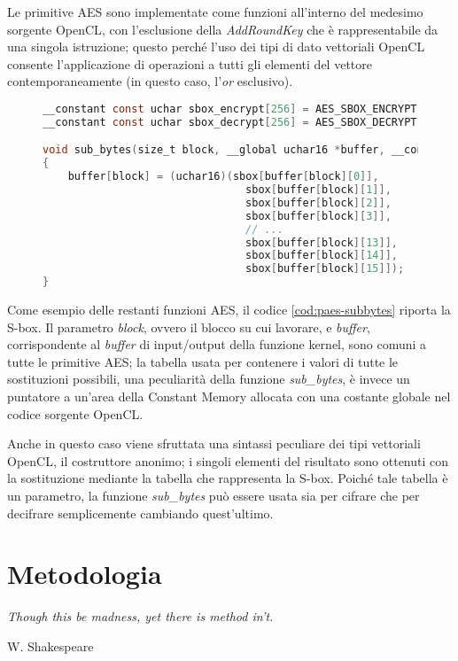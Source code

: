 \documentclass[12pt,a4paper,oneside]{book}
\begin{document}
Le primitive \ac{AES} sono implementate come funzioni all'interno del medesimo sorgente \ac{OpenCL}, con l'esclusione della \textit{AddRoundKey} che è rappresentabile da una singola istruzione; questo perché l'uso dei tipi di dato vettoriali \ac{OpenCL} consente l'applicazione di operazioni a tutti gli elementi del vettore contemporaneamente (in questo caso, l'\textit{or} esclusivo).

\begin{figure}
\begin{lstlisting}[caption={\textit{Funzione SubBytes definita nel kernel.}},label={cod:paes-subbytes},language=C]
__constant const uchar sbox_encrypt[256] = AES_SBOX_ENCRYPT;
__constant const uchar sbox_decrypt[256] = AES_SBOX_DECRYPT;

void sub_bytes(size_t block, __global uchar16 *buffer, __constant const uchar *sbox)
{
	buffer[block] = (uchar16)(sbox[buffer[block][0]], 
								sbox[buffer[block][1]],
								sbox[buffer[block][2]], 
								sbox[buffer[block][3]], 
								// ... 
								sbox[buffer[block][13]], 
								sbox[buffer[block][14]],
								sbox[buffer[block][15]]);
}
\end{lstlisting}
\end{figure}

Come esempio delle restanti funzioni \ac{AES}, il codice \ref{cod:paes-subbytes} riporta la \ac{S-box}. Il parametro \textit{block}, ovvero il blocco su cui lavorare, e \textit{buffer}, corrispondente al \textit{buffer} di input/output della funzione kernel, sono comuni a tutte le primitive \ac{AES}; la tabella usata per contenere i valori di tutte le sostituzioni possibili, una peculiarità della funzione \textit{sub\_bytes}, è invece un puntatore a un'area della Constant Memory allocata con una costante globale nel codice sorgente \ac{OpenCL}.

Anche in questo caso viene sfruttata una sintassi peculiare dei tipi vettoriali \ac{OpenCL}, il costruttore anonimo; i singoli elementi del risultato sono ottenuti con la sostituzione mediante la tabella che rappresenta la \ac{S-box}. Poiché tale tabella è un parametro, la funzione \textit{sub\_bytes} può essere usata sia per cifrare che per decifrare semplicemente cambiando quest'ultimo.

\chapter{Metodologia}
\linespread{1}
\epigraph{\textit{Though this be madness, yet there is method in't.}}{W. Shakespeare}
\linespread{1.3}
\end{document}
